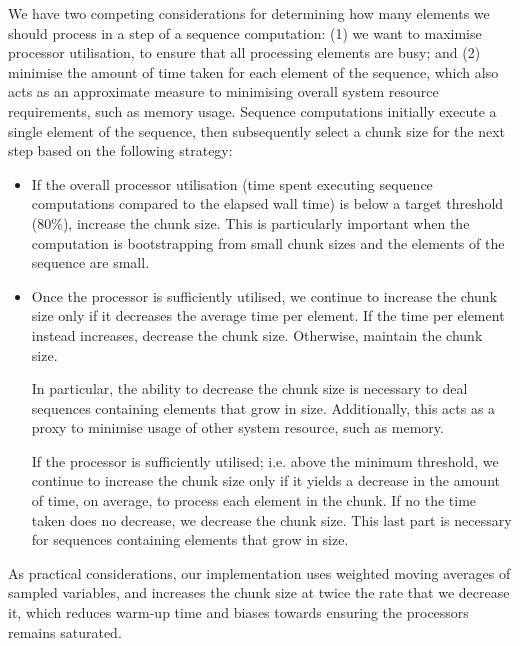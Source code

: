 We have two competing considerations for determining how many elements we should
process in a step of a sequence computation: (1) we want to maximise processor
utilisation, to ensure that all processing elements are busy; and (2) minimise
the amount of time taken for each element of the sequence, which also acts as an
approximate measure to minimising overall system resource requirements, such as
memory usage. Sequence computations initially execute a single element of the
sequence, then subsequently select a chunk size for the next step based on the
following strategy:
%
\begin{itemize}
  \item If the overall processor utilisation (time spent executing sequence
    computations compared to the elapsed wall time) is below a target threshold
    (80\%), increase the chunk size.
    This is particularly important when the computation is bootstrapping from
    small chunk sizes and the elements of the sequence are small.

  \item Once the processor is sufficiently utilised, we continue to increase the
    chunk size only if it decreases the average time per element. If the time
    per element instead increases, decrease the chunk size. Otherwise, maintain
    the chunk size.

    In particular, the ability to decrease the chunk size is
    necessary to deal sequences containing elements that grow in size.
    Additionally, this acts as a proxy to minimise usage of other system
    resource, such as memory.

    If the processor is sufficiently utilised; i.e. above the minimum
    threshold, we continue to increase the chunk size only if it yields a decrease
    in the amount of time, on average, to process each element in the chunk. If
    no the time taken does no decrease, we decrease the chunk size. This last
    part is necessary for sequences containing elements that grow in size.

\end{itemize}
%
As practical considerations, our implementation uses weighted moving averages of
sampled variables, and increases the chunk size at twice the rate that we
decrease it, which reduces warm-up time and biases towards ensuring the
processors remains saturated.

\endinput




